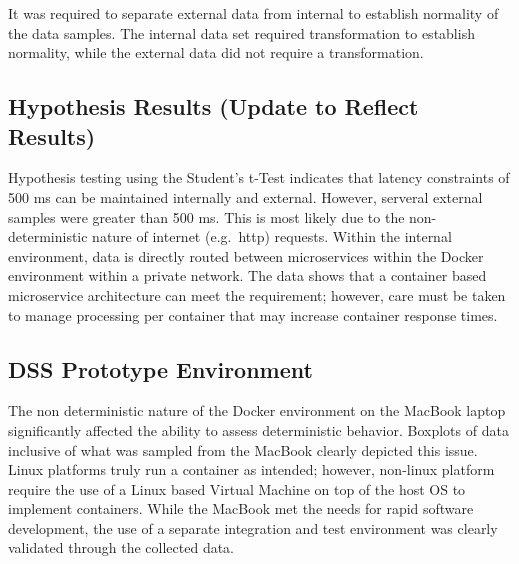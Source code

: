 \documentclass[
  letterpaper,
  DIV=11,
  numbers=noendperiod]{scrartcl}
\begin{document}
It was required to separate external data from internal to establish
normality of the data samples. The internal data set required
transformation to establish normality, while the external data did not
require a transformation.

\hypertarget{hypothesis-results-update-to-reflect-results}{%
\subsection{Hypothesis Results (Update to Reflect
Results)}\label{hypothesis-results-update-to-reflect-results}}

Hypothesis testing using the Student's t-Test indicates that latency
constraints of 500 ms can be maintained internally and external.
However, serveral external samples were greater than 500 ms. This is
most likely due to the non-deterministic nature of internet (e.g.~http)
requests. Within the internal environment, data is directly routed
between microservices within the Docker environment within a private
network. The data shows that a container based microservice architecture
can meet the requirement; however, care must be taken to manage
processing per container that may increase container response times.

\hypertarget{dss-prototype-environment}{%
\subsection{DSS Prototype Environment}\label{dss-prototype-environment}}

The non deterministic nature of the Docker environment on the MacBook
laptop significantly affected the ability to assess deterministic
behavior. Boxplots of data inclusive of what was sampled from the
MacBook clearly depicted this issue. Linux platforms truly run a
container as intended; however, non-linux platform require the use of a
Linux based Virtual Machine on top of the host OS to implement
containers. While the MacBook met the needs for rapid software
development, the use of a separate integration and test environment was
clearly validated through the collected data.
\end{document}
